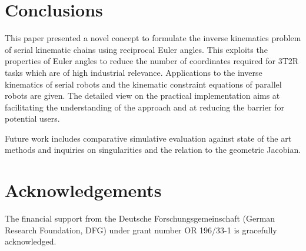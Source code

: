\documentclass{svproc}
\begin{document}
\section{Conclusions}
\label{sec:Conclusion}

This paper presented a novel concept to formulate the inverse kinematics problem of serial kinematic chains using reciprocal Euler angles.
This exploits the properties of Euler angles to reduce the number of coordinates required for 3T2R tasks which are of high industrial relevance.
Applications to the inverse kinematics of serial robots and the kinematic constraint equations of parallel robots are given.
The detailed view on the practical implementation aims at facilitating the understanding of the approach and at reducing the barrier for potential users.

Future work includes comparative simulative evaluation against state of the art methods and inquiries on singularities and the relation to the geometric Jacobian.


\section{Acknowledgements}

The financial support from the Deutsche Forschungsgemeinschaft (German Research Foundation, DFG) under grant number OR 196/33-1 is gracefully acknowledged.



\end{document}
